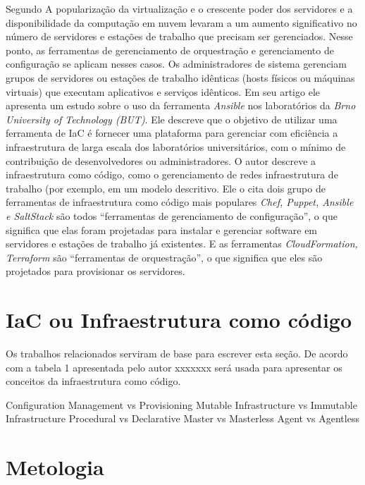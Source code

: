 \hfill

Segundo  A popularização da virtualização e o crescente poder dos servidores e a disponibilidade da computação em nuvem levaram a um aumento significativo no número de servidores e estações de trabalho que precisam ser gerenciados. Nesse ponto, as ferramentas de gerenciamento de orquestração e gerenciamento de configuração se aplicam nesses casos. Os administradores de sistema gerenciam grupos de servidores ou estações de trabalho idênticas (hosts físicos ou máquinas virtuais) que executam aplicativos e serviços idênticos. Em seu artigo ele apresenta um estudo sobre o uso da ferramenta \textit{Ansible} nos laboratórios da \textit{Brno University of Technology (BUT)}. Ele descreve que o objetivo de utilizar uma ferramenta de IaC é fornecer uma plataforma para gerenciar com eficiência a infraestrutura de larga escala dos laboratórios universitários, com o mínimo de contribuição de desenvolvedores ou administradores.
O autor descreve a infraestrutura como código, como o gerenciamento de redes infraestrutura de trabalho (por exemplo,  em um modelo descritivo. Ele o cita dois grupo de ferramentas de infraestrutura como código mais populares \textit{Chef, Puppet, Ansible e SaltStack} são todos “ferramentas de gerenciamento de configuração”, o que significa que elas foram projetadas para instalar e gerenciar software em servidores e estações de trabalho já existentes. E as ferramentas \textit{CloudFormation, Terraform} são “ferramentas de orquestração”, o que significa que eles são projetados para provisionar os servidores.


\section{\esp IaC ou Infraestrutura como código}

Os trabalhos relacionados serviram de base para escrever esta seção. De acordo com a tabela 1 apresentada pelo autor xxxxxxx será usada para apresentar os conceitos da infraestrutura como código.




Configuration Management vs Provisioning
Mutable Infrastructure vs Immutable Infrastructure
Procedural vs Declarative
Master vs Masterless
Agent vs Agentless








\section{\esp Metologia}
  
 


 